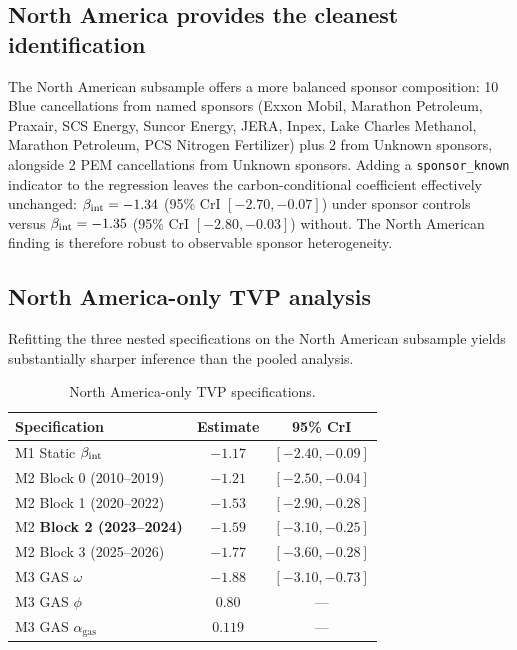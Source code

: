 \subsection{North America provides the cleanest identification}

The North American subsample offers a more balanced sponsor composition: 10 Blue cancellations from named sponsors (Exxon Mobil, Marathon Petroleum, Praxair, SCS Energy, Suncor Energy, JERA, Inpex, Lake Charles Methanol, Marathon Petroleum, PCS Nitrogen Fertilizer) plus 2 from Unknown sponsors, alongside 2 PEM cancellations from Unknown sponsors. Adding a \texttt{sponsor\_known} indicator to the regression leaves the carbon-conditional coefficient effectively unchanged: $\beta_{\mathrm{int}} = -1.34$ (95\% CrI $[-2.70, -0.07]$) under sponsor controls versus $\beta_{\mathrm{int}} = -1.35$ (95\% CrI $[-2.80, -0.03]$) without. The North American finding is therefore robust to observable sponsor heterogeneity.

\subsection{North America-only TVP analysis}

Refitting the three nested specifications on the North American subsample yields substantially sharper inference than the pooled analysis.

\begin{table}[h!]
\centering
\caption{North America-only TVP specifications.}
\begin{tabular}{lcc}
\toprule
Specification & Estimate & 95\% CrI \\
\midrule
M1 Static $\beta_{\mathrm{int}}$ & $-1.17$ & $[-2.40, -0.09]$ \\
M2 Block 0 (2010--2019) & $-1.21$ & $[-2.50, -0.04]$ \\
M2 Block 1 (2020--2022) & $-1.53$ & $[-2.90, -0.28]$ \\
M2 \textbf{Block 2 (2023--2024)} & $\mathbf{-1.59}$ & $\mathbf{[-3.10, -0.25]}$ \\
M2 Block 3 (2025--2026) & $-1.77$ & $[-3.60, -0.28]$ \\
M3 GAS $\omega$ & $-1.88$ & $[-3.10, -0.73]$ \\
M3 GAS $\phi$ & $0.80$ & --- \\
M3 GAS $\alpha_{\mathrm{gas}}$ & $0.119$ & --- \\
\bottomrule
\end{tabular}
\label{tab:ch7-na-tvp}
\end{table}

